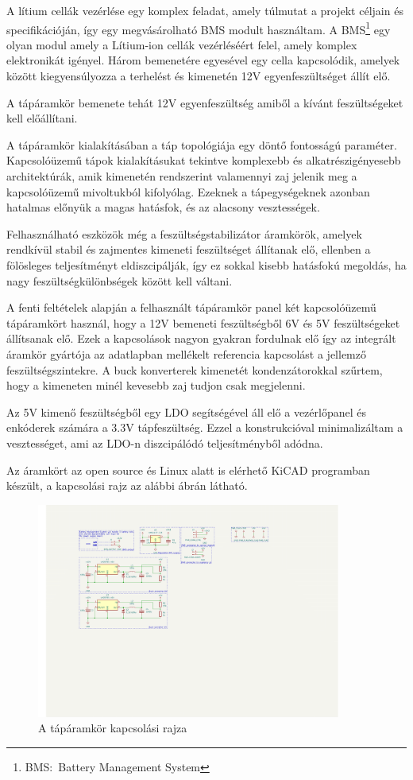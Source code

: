 \medskip

A lítium cellák vezérlése egy komplex feladat, amely túlmutat a projekt céljain
és specifikációján, így egy megvásárolható BMS modult használtam. A
BMS\footnote{BMS:~Battery Management System} egy olyan modul amely a Lítium-ion
cellák vezérléséért felel, amely komplex elektronikát igényel. Három bemenetére
egyesével egy cella kapcsolódik, amelyek között kiegyensúlyozza a terhelést és
kimenetén 12V egyenfeszültséget állít elő.

A tápáramkör bemenete tehát 12V egyenfeszültség amiből a kívánt feszültségeket
kell előállítani. 

\medskip

A tápáramkör kialakításában a táp topológiája egy döntő fontosságú paraméter.
Kapcsolóüzemű tápok kialakításukat tekintve komplexebb és alkatrészigényesebb
architektúrák, amik kimenetén rendszerint valamennyi zaj jelenik meg a
kapcsolóüzemű mivoltukból kifolyólag. Ezeknek a tápegységeknek azonban hatalmas
előnyük a magas hatásfok, és az alacsony vesztességek.

Felhasználható eszközök még a feszültségstabilizátor áramkörök, amelyek rendkívül
stabil és zajmentes kimeneti feszültséget állítanak elő, ellenben a fölösleges
teljesítményt eldiszcipálják, így ez sokkal kisebb hatásfokú megoldás, ha nagy
feszültségkülönbségek között kell váltani.

A fenti feltételek alapján a felhasznált tápáramkör panel két kapcsolóüzemű
tápáramkört használ, hogy a 12V bemeneti feszültségből 6V és 5V feszültségeket
állítsanak elő. Ezek a kapcsolások nagyon gyakran fordulnak elő így az integrált
áramkör gyártója az adatlapban mellékelt referencia kapcsolást a jellemző
feszültségszintekre. A buck konverterek kimenetét kondenzátorokkal szűrtem, hogy
a kimeneten minél kevesebb zaj tudjon csak megjelenni.

Az 5V kimenő feszültségből egy LDO segítségével áll elő a vezérlőpanel és
enkóderek számára a 3.3V tápfeszültség. Ezzel a konstrukcióval minimalizáltam
a vesztességet, ami az LDO-n diszcipálódó teljesítményből adódna. 

Az áramkört az open source és Linux alatt is elérhető KiCAD programban
készült, a kapcsolási rajz az alábbi ábrán látható.

\begin{figure}
  \centering
  \includegraphics[width=100mm, keepaspectratio]{figures/ch1/power-supply-unit-schematic.png}
  \caption{A tápáramkör kapcsolási rajza}
  \label{fig:pwr_schematic}
\end{figure}

